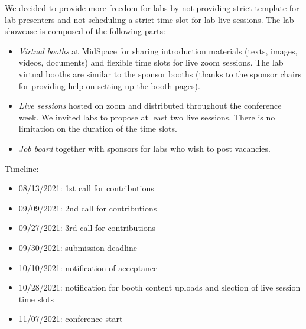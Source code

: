 \documentclass[%
10pt,								%
]
{scrartcl}
\begin{document}
We decided to provide more freedom for labs by not providing strict template for lab presenters and not scheduling a strict time slot for lab live sessions. The lab showcase is composed of the following parts:
            \begin{itemize}
                \item \textit{Virtual booths} at MidSpace for sharing introduction materials (texts, images, videos, documents) and flexible time slots for live zoom sessions. The lab virtual booths are similar to the sponsor booths (thanks to the sponsor chairs for providing help on setting up the booth pages).
                \item \textit{Live sessions} hosted on zoom and distributed throughout the conference week. We invited labs to propose at least two live sessions. There is no limitation on the duration of the time slots.
                \item \textit{Job board} together with sponsors for labs who wish to post vacancies.
            \end{itemize}
            
            Timeline:
            \begin{itemize}
                \item   08/13/2021: 1st call for contributions
                \item   09/09/2021: 2nd call for contributions
                \item   09/27/2021: 3rd call for contributions
                \item   09/30/2021: submission deadline
                \item   10/10/2021: notification of acceptance
                \item   10/28/2021: notification for booth content uploads and slection of live session time slots
                \item   11/07/2021: conference start
            \end{itemize}
            
\end{document}
